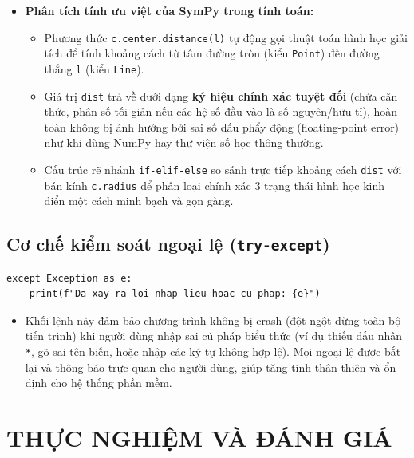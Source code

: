 \documentclass[12pt,a4paper]{article}
\begin{document}
\begin{itemize}
    \item \textbf{Phân tích tính ưu việt của SymPy trong tính toán:}
    \begin{itemize}
        \item Phương thức \texttt{c.center.distance(l)} tự động gọi thuật toán hình học giải tích để tính khoảng cách từ tâm đường tròn (kiểu \texttt{Point}) đến đường thẳng \texttt{l} (kiểu \texttt{Line}).
        \item Giá trị \texttt{dist} trả về dưới dạng \textbf{ký hiệu chính xác tuyệt đối} (chứa căn thức, phân số tối giản nếu các hệ số đầu vào là số nguyên/hữu tỉ), hoàn toàn không bị ảnh hưởng bởi sai số dấu phẩy động (floating-point error) như khi dùng NumPy hay thư viện số học thông thường.
        \item Cấu trúc rẽ nhánh \texttt{if-elif-else} so sánh trực tiếp khoảng cách \texttt{dist} với bán kính \texttt{c.radius} để phân loại chính xác 3 trạng thái hình học kinh điển một cách minh bạch và gọn gàng.
    \end{itemize}
\end{itemize}

\subsection{Cơ chế kiểm soát ngoại lệ (\texttt{try-except})}

\begin{lstlisting}
except Exception as e:
    print(f"Da xay ra loi nhap lieu hoac cu phap: {e}")
\end{lstlisting}

\begin{itemize}
    \item Khối lệnh này đảm bảo chương trình không bị crash (đột ngột dừng toàn bộ tiến trình) khi người dùng nhập sai cú pháp biểu thức (ví dụ thiếu dấu nhân \texttt{*}, gõ sai tên biến, hoặc nhập các ký tự không hợp lệ). Mọi ngoại lệ được bắt lại và thông báo trực quan cho người dùng, giúp tăng tính thân thiện và ổn định cho hệ thống phần mềm.
\end{itemize}

\renewcommand{\arraystretch}{1.4} 
\pagebreak


\section{THỰC NGHIỆM VÀ ĐÁNH GIÁ}
\end{document}

